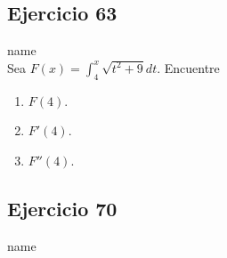 \documentclass[12pt]{article}
\begin{document}
\subsection{Ejercicio 63} name \\

Sea $F(x)=\int_{4}^{x} \sqrt{t^2+9}dt$. Encuentre
\begin{enumerate}[label=(\alph*)]
\item $F(4)$.
  
\item $F'(4)$.
  
\item $F''(4)$.
  
\end{enumerate}

\subsection{Ejercicio 70} name \\
\end{document}
